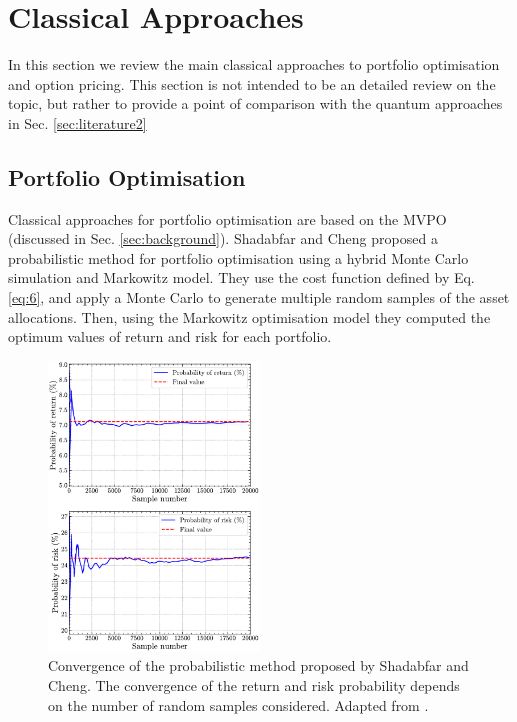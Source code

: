 \documentclass[prx,twocolumn,floatfix,superscriptaddress,longbibliography]{revtex4-1}
\begin{document}
\section{Classical Approaches}\label{sec:literature1}

In this section we review the main classical approaches to portfolio optimisation and option pricing. 
This section is not intended to be an detailed review on the topic, but rather to provide a point of comparison with the quantum approaches in Sec. \ref{sec:literature2}

\subsection{Portfolio Optimisation}

Classical approaches for portfolio optimisation are based on the MVPO (discussed in Sec. \ref{sec:background}).  
Shadabfar and  Cheng \cite{Shadabfar2020} proposed a probabilistic method for portfolio optimisation using a hybrid Monte Carlo simulation and Markowitz model. They use the cost function defined by Eq. 
\ref{eq:6}, and apply a Monte Carlo to generate multiple random samples of the asset allocations. Then, using the Markowitz optimisation model they computed the optimum values of return and risk for each portfolio. 
\begin{figure}[h!]
\centering 
\includegraphics[width=0.5\textwidth]{return-risk-error.pdf}
  \caption{\label{fig:monte-carlo} Convergence of the probabilistic method proposed by Shadabfar and Cheng. The convergence of the return and risk probability depends on the number of random samples considered. Adapted from \cite{Shadabfar2020}.} 
\end{figure}
\end{document}
